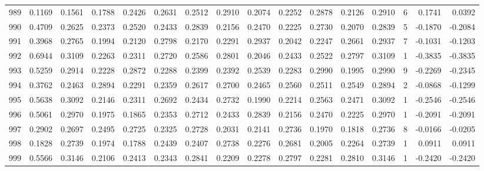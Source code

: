 \begin{tabular}{lrrrrrrrrrrrrrrr}
989 &      0.1169 &  0.1561 &  0.1788 &  0.2426 &  0.2631 &  0.2512 &  0.2910 &  0.2074 &  0.2252 &  0.2878 &   0.2126 &     0.2910 &      6 &                    0.1741 &                     0.0392 \\
990 &      0.4709 &  0.2625 &  0.2373 &  0.2520 &  0.2433 &  0.2839 &  0.2156 &  0.2470 &  0.2225 &  0.2730 &   0.2070 &     0.2839 &      5 &                   -0.1870 &                    -0.2084 \\
991 &      0.3968 &  0.2765 &  0.1994 &  0.2120 &  0.2798 &  0.2170 &  0.2291 &  0.2937 &  0.2042 &  0.2247 &   0.2661 &     0.2937 &      7 &                   -0.1031 &                    -0.1203 \\
992 &      0.6944 &  0.3109 &  0.2263 &  0.2311 &  0.2720 &  0.2586 &  0.2801 &  0.2046 &  0.2433 &  0.2522 &   0.2797 &     0.3109 &      1 &                   -0.3835 &                    -0.3835 \\
993 &      0.5259 &  0.2914 &  0.2228 &  0.2872 &  0.2288 &  0.2399 &  0.2392 &  0.2539 &  0.2283 &  0.2990 &   0.1995 &     0.2990 &      9 &                   -0.2269 &                    -0.2345 \\
994 &      0.3762 &  0.2463 &  0.2894 &  0.2291 &  0.2359 &  0.2617 &  0.2700 &  0.2465 &  0.2560 &  0.2511 &   0.2549 &     0.2894 &      2 &                   -0.0868 &                    -0.1299 \\
995 &      0.5638 &  0.3092 &  0.2146 &  0.2311 &  0.2692 &  0.2434 &  0.2732 &  0.1990 &  0.2214 &  0.2563 &   0.2471 &     0.3092 &      1 &                   -0.2546 &                    -0.2546 \\
996 &      0.5061 &  0.2970 &  0.1975 &  0.1865 &  0.2353 &  0.2712 &  0.2433 &  0.2839 &  0.2156 &  0.2470 &   0.2225 &     0.2970 &      1 &                   -0.2091 &                    -0.2091 \\
997 &      0.2902 &  0.2697 &  0.2495 &  0.2725 &  0.2325 &  0.2728 &  0.2031 &  0.2141 &  0.2736 &  0.1970 &   0.1818 &     0.2736 &      8 &                   -0.0166 &                    -0.0205 \\
998 &      0.1828 &  0.2739 &  0.1974 &  0.1788 &  0.2439 &  0.2407 &  0.2738 &  0.2276 &  0.2681 &  0.2005 &   0.2264 &     0.2739 &      1 &                    0.0911 &                     0.0911 \\
999 &      0.5566 &  0.3146 &  0.2106 &  0.2413 &  0.2343 &  0.2841 &  0.2209 &  0.2278 &  0.2797 &  0.2281 &   0.2810 &     0.3146 &      1 &                   -0.2420 &                    -0.2420 \\
\bottomrule
\end{tabular}
